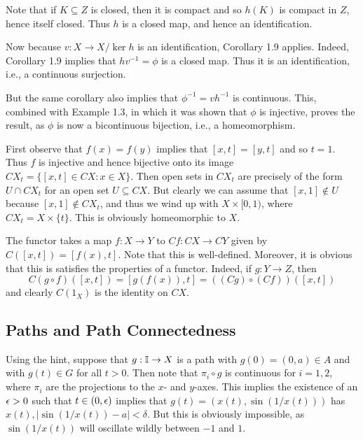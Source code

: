 \documentclass[../solutions.tex]{subfiles}
\begin{document}
\begin{exercise} \leavevmode
Note that if $K\subseteq Z$ is closed, then it is compact and so $h(K)$ is compact in $Z$, hence itself closed. Thus $h$ is a closed map, and hence an identification. 

Now because $v:X\to X/\ker h$ is an identification, Corollary 1.9 applies. Indeed, Corollary 1.9 implies that $hv^{-1}=\phi$ is a closed map. Thus it is an identification, i.e., a continuous surjection. 

But the same corollary also implies that $\phi^{-1}=vh^{-1}$ is continuous. This, combined with Example 1.3, in which it was shown that $\phi$ is injective, proves the result, as $\phi$ is now a bicontinuous bijection, i.e., a homeomorphism. 
\end{exercise} 

\begin{exercise} \leavevmode
First observe that $f(x)=f(y)$ implies that $[x,t]=[y,t]$ and so $t=1$. Thus $f$ is injective and hence bijective onto its image $CX_t=\{[x,t]\in CX:x\in X\}$. Then open sets in $CX_t$ are precisely of the form $U\cap CX_t$ for an open set $U\subseteq CX$. But clearly we can assume that $[x,1]\not\in U$ because $[x,1]\not\in CX_t$, and thus we wind up with $X\times[0,1)$, where $CX_t=X\times\{t\}$. This is obviously homeomorphic to $X$. 
\end{exercise} 

\begin{exercise} \leavevmode
The functor takes a map $f:X\to Y$ to $Cf:CX\to CY$ given by $C([x,t])=[f(x),t]$. Note that this is well-defined. Moreover, it is obvious that this is satisfies the properties of a functor. Indeed, if $g:Y\to Z$, then \[C(g\circ f)([x,t])=[g(f(x)),t]=((Cg)\circ(Cf))([x,t])\] and clearly $C(1_X)$ is the identity on $CX$. 
\end{exercise} 

\subsection{Paths and Path Connectedness} 
\begin{exercise} \leavevmode
Using the hint, suppose that $g:\mathbb I\to X$ is a path with $g(0)=(0,a)\in A$ and with $g(t)\in G$ for all $t>0$. Then note that $\pi_i\circ g$ is continuous for $i=1,2$, where $\pi_i$ are the projections to the $x$- and $y$-axes. This implies the existence of an $\epsilon>0$ such that $t\in(0,\epsilon)$ implies that $g(t)=(x(t),\sin(1/x(t)))$ has $x(t),|\sin(1/x(t))-a|<\delta$. But this is obviously impossible, as $\sin(1/x(t))$ will oscillate wildly between $-1$ and $1$. 
\end{exercise} 
\end{document}
